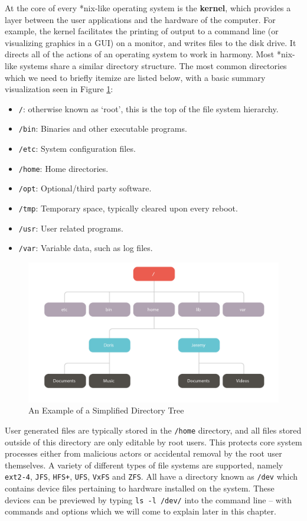 \documentclass[11pt]{article}
\begin{document}
At the core of every *nix-like operating system is the \textbf{kernel}, which provides a layer between the user applications and the hardware of the computer. For example, the kernel facilitates the printing of output to a command line (or visualizing graphics in a GUI) on a monitor, and writes files to the disk drive. It directs all of the actions of an operating system to work in harmony. Most *nix-like systems share a similar directory structure. The most common directories which we need to briefly itemize are listed below, with a basic summary visualization seen in Figure \ref{directorytree}:

\begin{itemize}
\item \texttt{/}: otherwise known as `root', this is the top of the file system hierarchy.
\item \texttt{/bin}: Binaries and other executable programs.
\item \texttt{/etc}: System configuration files.
\item \texttt{/home}: Home directories.
\item \texttt{/opt}: Optional/third party software.
\item \texttt{/tmp}: Temporary space, typically cleared upon every reboot.
\item \texttt{/usr}: User related programs.
\item \texttt{/var}: Variable data, such as log files.
\end{itemize}

\begin{figure}[!t]
\caption{An Example of a Simplified Directory Tree}\label{directorytree}
\centering
\includegraphics[width=1\textwidth]{Infographic2}
\end{figure}

User generated files are typically stored in the \texttt{/home} directory, and all files stored outside of this directory are only editable by root users. This protects core system processes either from malicious actors or accidental removal by the root user themselves. A variety of different types of file systems are supported, namely \texttt{ext2-4}, \texttt{JFS}, \texttt{HFS+}, \texttt{UFS}, \texttt{VxFS} and \texttt{ZFS}.  All have a directory known as \texttt{/dev} which contains device files pertaining to hardware installed on the system. These devices can be previewed by typing \texttt{ls -l /dev/} into the command line -- with commands and options which we will come to explain later in this chapter. 
\end{document}
